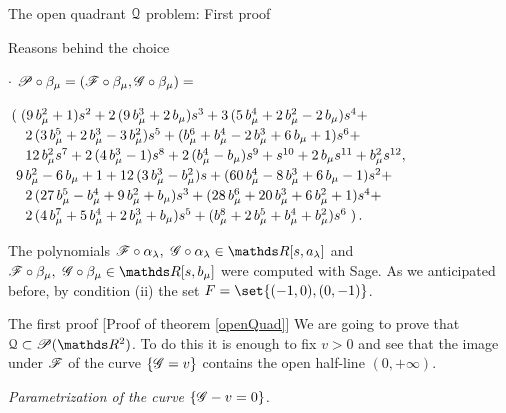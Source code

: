 \documentclass[11pt, a4paper, english, twoside, notitlepage, openright]{report}
\begin{document}
\begin{chapter}{The open quadrant $\mathcal{Q}$ problem: First proof}
\begin{section}{Reasons behind the choice}
\begin{enumerate}[(i)]
$\cdot$ $\mathscr{P}\circ\beta_{\mu}=(\mathscr{F}\circ\beta_{\mu},\mathscr{G}\circ\beta_{\mu})=
$
				
				$\arraycolsep=2pt\def\arraystretch{1.2}
\begin{array}{l}
\left(\right.{(9 \,b_{\mu}^{2}+1)}s^{2}+2 \,{(9 \,b_{\mu}^{3}+2\,b_{\mu})}s^{3}+3\,{(5\,b_{\mu}^{4}+2\,b_{\mu}^{2}-2\,b_{\mu})}s^{4}+\\
\quad 2\,{(3 \,b_{\mu}^{5}+2\,b_{\mu}^{3}-3\,b_{\mu}^{2})}s^{5}+{(b_{\mu}^{6}+b_{\mu}^{4}-2\,b_{\mu}^{3}+6\,b_{\mu}+1)} s^{6}+\\
\quad 12\,b_{\mu}^{2} s^{7}+2\,{(4\,b_{\mu}^{3}-1)}s^{8}+2\,{(b_{\mu}^{4}-b_{\mu})}s^{9}+s^{10}+2\,b_{\mu}s^{11}+b_{\mu}^{2} s^{12},\\
					\ 9 \, b_{\mu}^{2}-6 \, b_{\mu}+1+12 \, {(3 \, b_{\mu}^{3} - b_{\mu}^{2})} s+{(60\, b_{\mu}^{4} - 8 \, b_{\mu}^{3}+6 \, b_{\mu}-1)}s^{2} + \\
					\quad 2 \, {(27\,b_{\mu}^{5}-b_{\mu}^{4}+9\,b_{\mu}^{2}+b_{\mu})}s^{3}+{(28\,b_{\mu}^{6}+20\,b_{\mu}^{3}+6\,b_{\mu}^{2}+1)} s^{4}+\\
					\quad2\,{(4\,b_{\mu}^{7}+5\,b_{\mu}^{4}+2\,b_{\mu}^{3}+b_{\mu})}s^{5}+{(b_{\mu}^{8}+2\,b_{\mu}^{5}+ b_{\mu}^{4} +b_{\mu}^{2})} s^{6}\left.\right).
					\end{array}
$
\end{enumerate}
The polynomials $\F\circ\alpha_{\lambda },\ \G\circ\alpha_{\lambda}\in\R[s,a_{\lambda}]$ and $\F\circ\beta_{\mu},\ \G\circ\beta_{\mu}\in\R[s,b_{\mu}]$ were computed with Sage. As we anticipated before, by condition (ii) the set $F=\set{(-1, 0),(0,-1)}$.
\end{section}
\begin{section}{The first proof} [Proof of theorem \ref{openQuad}] We are going to prove that $\Qu\subset\P(\R^2)$. To do this it is enough to fix $v>0$ and see that the image under $\mathscr{F}$ of the curve $\{\mathscr{G}=v\}$ contains the open half-line $(0,+\infty)$.
\begin{center}
 \emph{Parametrization of the curve $\{\mathscr{G}-v=0\}$.}
\end{center}\label{step1}


\end{section}
\end{chapter}
\end{document}
